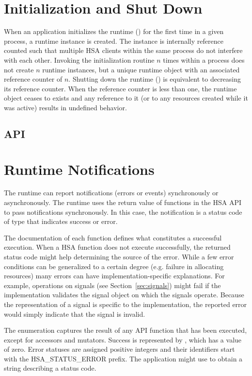 \documentclass[final]{book}
\newcommand{\reftyp}[1]{#1}
\newcommand{\refenu}[1]{\reftyp{#1}}
\begin{document}
\section{Initialization and Shut Down}\label{sec:init}
When an application initializes the runtime () for the first time
in a given process, a runtime instance is created. The instance is internally
reference counted such that multiple HSA clients within the same process do not
interfere with each other. Invoking the initialization routine $n$ times within
a process does not create $n$ runtime instances, but a unique runtime object
with an associated reference counter of $n$. Shutting down the runtime
() is equivalent to decreasing its reference counter. When
the reference counter is less than one, the runtime object ceases to exists and
any reference to it (or to any resources created while it was active) results in
undefined behavior.

\subsection{API}


\section{Runtime Notifications}
\label{sec:error}

The runtime can report notifications (errors or events) synchronously
or asynchronously. The runtime uses the return value of functions in the HSA API
to pass notifications synchronously. In this case, the notification is a status
code of type  that indicates success or error.

The documentation of each function defines what constitutes a successful
execution. When a HSA function does not execute successfully, the returned
status code might help determining the source of the error. While a few error
conditions can be generalized to a certain degree (e.g. failure in allocating
resources) many errors can have implementation-specific explanations. For
example, operations on signals (see Section~\ref{sec:signals}) might
fail if the implementation validates the signal object on which the signals
operate. Because the representation of a signal is specific to the
implementation, the reported error would simply indicate that the signal is
invalid.

The  enumeration captures the result of any API function
that has been executed, except for accessors and mutators. Success is
represented by , which has a value of zero. Error
statuses are assigned positive integers and their identifiers start with the
\refenu{HSA_STATUS_ERROR} prefix. The application might use
 to obtain a string describing a status code.
\end{document}
